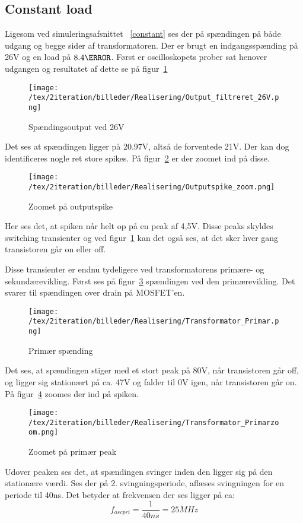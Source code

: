 
\subsection{Constant load}
\noindent Ligesom ved simuleringsafsnittet ~\ref{constant} ses der på spændingen på både udgang og begge sider af transformatoren. Der er brugt en indgangsspænding på 26V og en load på $8.4\ohm$. 
Først er oscilloskopets prober sat henover udgangen og resultatet af dette se på figur~\ref{fig: Out26V}
\begin{figure}[H]
	\center
	\texttt{[image: /tex/2iteration/billeder/Realisering/Output\_filtreret\_26V.png]}
	\caption{Spændingsoutput ved 26V}
	\label{fig: Out26V}
\end{figure}
\noindent Det ses at spændingen ligger på 20.97V, altså de forventede 21V. Der kan dog identificeres nogle ret store spikes. På figur~\ref{fig: Out26Vzoom} er der zoomet ind på disse.
\begin{figure}[H]
	\center
	\texttt{[image: /tex/2iteration/billeder/Realisering/Outputspike\_zoom.png]}
	\caption{Zoomet på outputspike}
	\label{fig: Out26Vzoom}
\end{figure}
\noindent Her ses det, at spiken når helt op på en peak af 4,5V. Disse peaks skyldes switching transienter og ved figur~\ref{fig: Out26V} kan det også ses, at det sker hver gang transistoren går on eller off.

\noindent Disse transienter er endnu tydeligere ved transformatorens primære- og sekundærevikling. Først ses på figur~\ref{fig: privolt} spændingen ved den primærevikling. Det svarer til spændingen over drain på MOSFET'en. 
\begin{figure}[H]
	\center
	\texttt{[image: /tex/2iteration/billeder/Realisering/Transformator\_Primar.png]}
	\caption{Primær spænding}
	\label{fig: privolt}
\end{figure}
\noindent Det ses, at spændingen stiger med et stort peak på 80V, når transistoren går off, og ligger sig stationært på ca. 47V og falder til 0V igen, når transistoren går on. På figur~\ref{fig: prizoom} zoomes der ind på spiken.
\begin{figure}[H]
	\center
	\texttt{[image: /tex/2iteration/billeder/Realisering/Transformator\_Primarzoom.png]}
	\caption{Zoomet på primær peak}
	\label{fig: prizoom}
\end{figure}
Udover peaken ses det, at spændingen svinger inden den ligger sig på den stationære værdi. Ses der på 2. svingningsperiode, aflæses svingningen for en periode til 40ns. Det betyder at frekvensen der ses ligger på ca:
\begin{equation} \label{svingpri}
f_{oscpri} = \frac{1}{40ns} = 25MHz
\end{equation}

